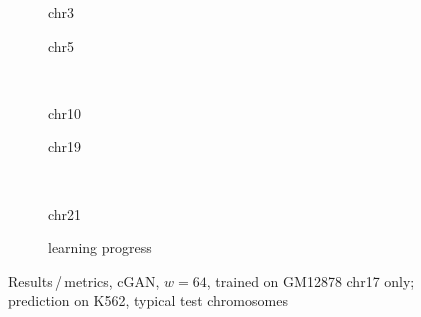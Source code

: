 \begin{figure}[p] %
    \begin{subfigure}{0.45\textwidth}
        \scriptsize
        \caption{chr3}
    \end{subfigure} \hfill
    \begin{subfigure}{0.45\textwidth}
        \scriptsize
        \caption{chr5}
    \end{subfigure}\\[5mm]
    \begin{subfigure}{0.45\textwidth}
        \scriptsize
        \caption{chr10}
    \end{subfigure}\hfill
    \begin{subfigure}{0.45\textwidth}
        \scriptsize
        \caption{chr19}
    \end{subfigure}\\[3mm]
    \centering
    \begin{subfigure}{0.45\textwidth}
        \scriptsize
        \caption{chr21}
    \end{subfigure} \hfill
    \begin{subfigure}{0.45\textwidth}
        \scriptsize
        \caption{learning progress} \label{fig:appendix:GAN64-17single_lossEpochs}
    \end{subfigure}
    \caption{Results\,/\,metrics, cGAN, $w=64$, trained on GM12878 chr17 only; prediction on K562, typical test chromosomes}   \label{fig:appendix:GAN64-17single_pearson}
\end{figure}
